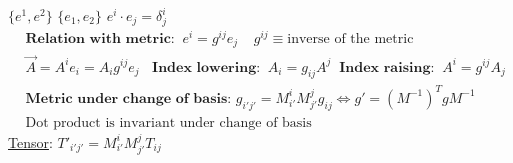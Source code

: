 \underline{} $\{e^1, e^2\}$  $\{e_1, e_2\}$ \; \; $e^i\cdot e_j = \delta^i_j$
\begin{align*}
&\textbf{Relation with metric:} \;\;  e^i = g^{ij} e_j \;\; \;\;g^{ij}\equiv \text{inverse of the metric}\\
&\vec{A} = A^i e_i = A_i g^{ij} e_j \; \; \textbf{ Index lowering:} \;\;  A_i = g_{ij} A^j \;\;  \textbf{Index raising:} \;\;  A^i = g^{ij} A_j \\
&\textbf{Metric under change of basis: } g_{i'j'} = M^i_{i'} M^j_{j'} g_{ij} \Leftrightarrow  g' = (M^{-1})^T g M^{-1} \\
&\text{Dot product is invariant under change of basis}
\end{align*}
\underline{Tensor}:\; $T'_{i'j'} = M^i_{i'} M^j_{j'} T_{ij}$\; 
